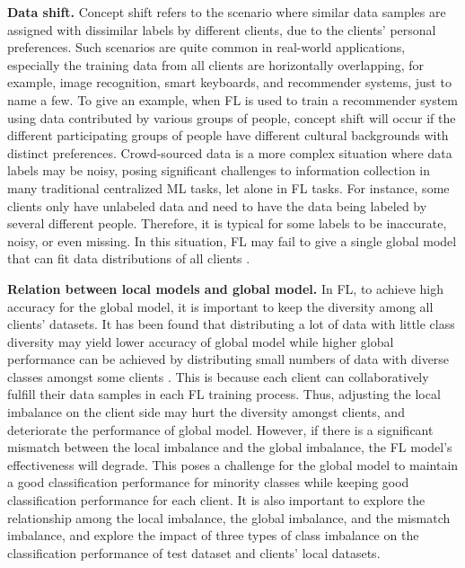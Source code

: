 \documentclass[10pt,journal,compsoc]{IEEEtran}
\begin{document}
\textbf{Data shift.}
Concept shift refers to the scenario where similar data samples are assigned with dissimilar labels by different clients, due to the clients' personal preferences. Such scenarios are quite common in real-world applications, especially the training data from all clients are horizontally overlapping, for example, image recognition, smart keyboards, and recommender systems, just to name a few. To give an example, when FL is used to train a recommender system using data contributed by various groups of people, concept shift will occur if the different participating groups of people have different cultural backgrounds with distinct preferences. Crowd-sourced data \cite{bassily2014private} is a more complex situation where data labels may be noisy, posing significant challenges to information collection in many traditional centralized ML tasks, let alone in FL tasks. For instance, some clients only have unlabeled data and need to have the data being labeled by several different people. Therefore, it is typical for some labels to be inaccurate, noisy, or even missing. In this situation, FL may fail to give a single global model that can fit data distributions of all clients \cite{fallah2020personalized} \cite{ghosh2020efficient} \cite{kairouz2021advances} \cite{mansour2020three} \cite{sattler2020clustered} \cite{smith2017federated} \cite{fu2021cic}.

\textbf{Relation between local models and global model.}	
In FL, to achieve high accuracy for the global model, it is important to keep the diversity among all clients' datasets. It has been found that distributing a lot of data with little class diversity may yield lower accuracy of global model while higher global performance can be achieved by distributing small numbers of data with diverse classes amongst some clients \cite{sittijuk2021performance}. This is because each client can collaboratively fulfill their data samples in each FL training process. Thus, adjusting the local imbalance on the client side may hurt the diversity amongst clients, and deteriorate the performance of global model. However, if there is a significant mismatch between the local imbalance and the global imbalance, the FL model's effectiveness will degrade. This poses a challenge for the global model to maintain a good classification performance for minority classes while keeping good classification performance for each client. It is also important to explore the relationship among the local imbalance, the global imbalance, and the mismatch imbalance, and explore the impact of three types of class imbalance on the classification performance of test dataset and clients' local datasets.
\end{document}
